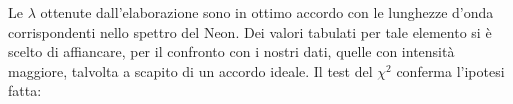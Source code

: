\begin{center}
\end{center}





Le $\lambda$ ottenute dall'elaborazione sono in ottimo accordo con le lunghezze d'onda corrispondenti nello spettro del Neon. Dei valori tabulati per tale elemento si è scelto di affiancare, per il confronto con i nostri dati, quelle con intensità maggiore, talvolta a scapito di un accordo ideale. Il test del ${\chi}^2$ conferma l'ipotesi fatta:

